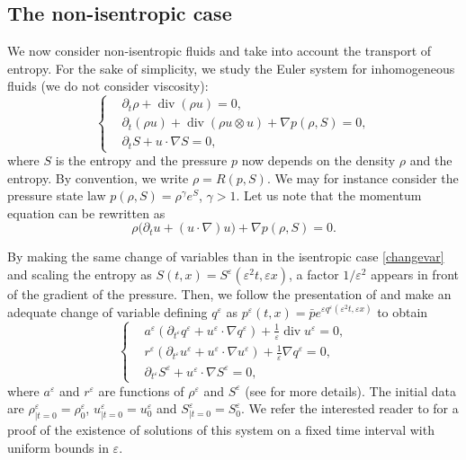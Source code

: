 \documentclass[11pt, twoside, a4paper]{article}
\theoremstyle{plain}
\theoremstyle{remark}
\numberwithin{equation}{section}
\renewcommand{\div}{\operatorname{div}}
\newcommand{\dt}{\partial_t}
\newcommand{\eps}{\varepsilon}
\begin{document}
\subsection{The non-isentropic case}

We now consider non-isentropic fluids and take into account the transport of entropy. For the sake of simplicity, we study the Euler system for inhomogeneous fluids (we do not consider viscosity):
\begin{equation*}
\left\{
\begin{aligned}
    &\dt \rho + \div (\rho u) = 0,\\
    &\dt (\rho u) + \div (\rho u \otimes u) + \nabla p(\rho,S) =0,\\
    &\dt S + u \cdot \nabla S = 0,
\end{aligned}
\right.
\end{equation*}
where $S$ is the entropy and the pressure $p$ now depends on the density $\rho$ and the entropy. By convention, we write $\rho = R(p,S)$. We may for instance consider the pressure state law $p(\rho,S)=\rho^\gamma e^S$, $\gamma>1$. Let us note that the momentum equation can be rewritten as
\[
\rho \Big( \dt u+(u\cdot \nabla )u \Big) + \nabla p(\rho,S) = 0.
\]

By making the same change of variables than in the isentropic case \eqref{changevar} and scaling the entropy as $S(t,x) = S^\eps(\eps^2t,\eps x)$, a factor $1/\eps^2$ appears in front of the gradient of the pressure. Then, we follow the presentation of \cite{metivier2001limite} and make an adequate change of variable defining $q^\eps$ as $p^\eps(t,x) = \bar{p} e^{\eps q^\eps (\eps^2t,\eps x)}$ to obtain
\begin{equation*}
\left\{
\begin{aligned}
    &a^\eps (\partial_{t^\eps} q^\eps + u^\eps \cdot \nabla q^\eps) + \frac{1}{\eps} \div u^\eps =0,\\
   & r^\eps (\partial_{t^\eps} u^\eps + u^\eps \cdot \nabla u^\eps) + \frac{1}{\eps} \nabla q^\eps = 0,\\
   &\partial_{t^\eps} S^\eps + u^\eps \cdot \nabla S^\eps = 0,
\end{aligned}
\right.
\end{equation*}
where $a^\eps$ and $r^\eps$ are functions of $\rho^\eps$ and $S^\eps$ (see \cite{metivier2001limite} for more details). The initial data are $\rho^\eps_{\lvert t=0 }=\rho^\eps_0$, $u^\eps_{\lvert t=0 }=u^\eps_0$ and $S^\eps_{\lvert t=0 }=S^\eps_0$. We refer the interested reader to \cite{metivier2003averaging} for a proof of the existence of solutions of this system on a fixed time interval with uniform bounds in $\eps$.
\end{document}
